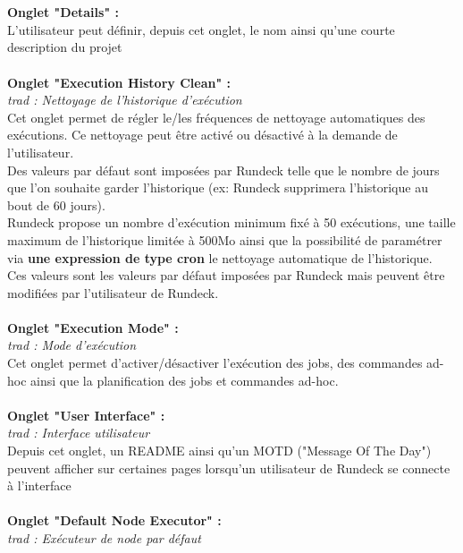\documentclass[12pt]{article}
\begin{document}
\\
\vspace{0.5cm}
\\
\textbf{Onglet "Details" :}
\\
L'utilisateur peut définir, depuis cet onglet, le nom ainsi qu'une courte description du projet
\\
\vspace{0.2cm}
\\
\textbf{Onglet "Execution History Clean" :}
\\
\textit{trad : Nettoyage de l'historique d'exécution}
\\
Cet onglet permet de régler le/les fréquences de nettoyage automatiques des exécutions. Ce nettoyage peut être activé ou désactivé à la demande de l'utilisateur.
\\
Des valeurs par défaut sont imposées par Rundeck telle que le nombre de jours que l'on souhaite garder l'historique (ex: Rundeck supprimera l'historique au bout de 60 jours).
\\
Rundeck propose un nombre d'exécution minimum fixé à 50 exécutions, une taille maximum de l'historique limitée à 500Mo ainsi que la possibilité de paramétrer via \textbf{une expression de type cron} le nettoyage automatique de l'historique.
\\
Ces valeurs sont les valeurs par défaut imposées par Rundeck mais peuvent être modifiées par l'utilisateur de Rundeck.
\\
\vspace{0.2cm}
\\
\textbf{Onglet "Execution Mode" :}
\\
\textit{trad : Mode d'exécution}
\\
Cet onglet permet d'activer/désactiver l'exécution des jobs, des commandes ad-hoc ainsi que la planification des jobs et commandes ad-hoc.
\\
\vspace{0.2cm}
\\
\textbf{Onglet "User Interface" :}
\\
\textit{trad : Interface utilisateur}
\\
Depuis cet onglet, un README ainsi qu'un MOTD ("Message Of The Day") peuvent afficher sur certaines pages lorsqu'un utilisateur de Rundeck se connecte à l'interface
\\
\vspace{0.2cm}
\\
\textbf{Onglet "Default Node Executor" :}
\\
\textit{trad : Exécuteur de node par défaut }
\end{document}
